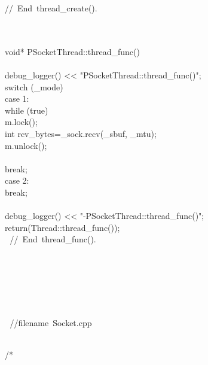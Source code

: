\documentclass{article}
\begin{document}
\hbox{// End thread_create().}\strut\\
 
\\
 void* PSocketThread::thread_func()
\\
 {
\\
     debug_logger() << "PSocketThread::thread_func()\n";
\\
         switch (_mode) {
\\
         case 1:
\\
                 while (true) {
\\
                         m.lock();
\\
                         int rcv_bytes=_sock.recv(_sbuf, _mtu);
\\
                         m.unlock();
\\
                 }
\\
                 break;
\\
         case 2:
\\
                 break;
\\
         }
\\
     debug_logger() << "-PSocketThread::thread_func()\n";
\\
         return(Thread::thread_func());
\\
 }  
\hbox{// End thread_func().}\strut\\
 
\\
\strut\\
\strut\goodbreak
{}\strut\nopagebreak\\
 
\hbox{//$$filename Socket.cpp}\strut\\
\hbox{/*}
\end{document}
